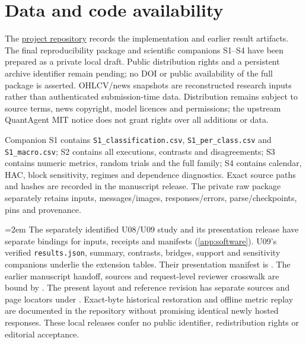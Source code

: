\section*{Data and code availability}
The \href{https://github.com/DungPhanHoangg05/A-Multi-Agent-Large-Language-Model-Approach-to-Price-Driven-Stock-Trading-in-the-Vietnamese-Stock-Ma}{project repository} records the implementation and earlier result artifacts. The final reproducibility package and scientific companions S1--S4 have been prepared as a private local draft. Public distribution rights and a persistent archive identifier remain pending; no DOI or public availability of the full package is asserted. OHLCV/news snapshots are reconstructed research inputs rather than authenticated submission-time data. Distribution remains subject to source terms, news copyright, model licences and permissions; the upstream QuantAgent MIT notice does not grant rights over all additions or data.

Companion S1 contains \texttt{S1\_classification.csv}, \texttt{S1\_per\_class.csv} and \texttt{S1\_macro.csv}; S2 contains all executions, contrasts and disagreements; S3 contains numeric metrics, random trials and the full family; S4 contains calendar, HAC, block sensitivity, regimes and dependence diagnostics. Exact source paths and hashes are recorded in the manuscript release. The private raw package separately retains inputs, messages/images, responses/errors, parse/checkpoints, pins and provenance.

\begingroup\emergencystretch=2em
The separately identified U08/U09 study and its presentation release have separate bindings for inputs, receipts and manifests (\ref{app:software}). U09's verified \texttt{results.json}, summary, contrasts, bridges, support and sensitivity companions underlie the extension tables. Their presentation manifest is . The earlier manuscript handoff, sources and request-level reviewer crosswalk are bound by . The present layout and reference revision has separate sources and page locators under . Exact-byte historical restoration and offline metric replay are documented in the repository without promising identical newly hosted responses. These local releases confer no public identifier, redistribution rights or editorial acceptance.
\par\endgroup
